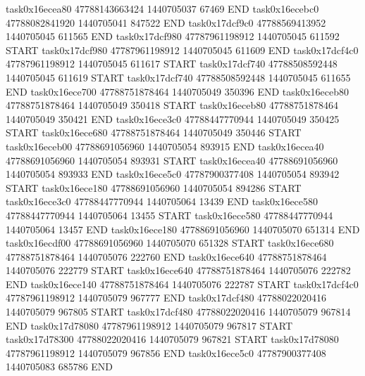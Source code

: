 task0x16ecea80 47788143663424          1440705037                67469  END
task0x16ecebc0 47788082841920          1440705041               847522  END
task0x17dcf9c0 47788569413952          1440705045               611565  END
task0x17dcf980 47787961198912          1440705045               611592  START
task0x17dcf980 47787961198912          1440705045               611609  END
task0x17dcf4c0 47787961198912          1440705045               611617  START
task0x17dcf740 47788508592448          1440705045               611619  START
task0x17dcf740 47788508592448          1440705045               611655  END
task0x16ece700 47788751878464          1440705049               350396  END
task0x16eceb80 47788751878464          1440705049               350418  START
task0x16eceb80 47788751878464          1440705049               350421  END
task0x16ece3c0 47788447770944          1440705049               350425  START
task0x16ece680 47788751878464          1440705049               350446  START
task0x16eceb00 47788691056960          1440705054               893915  END
task0x16ecea40 47788691056960          1440705054               893931  START
task0x16ecea40 47788691056960          1440705054               893933  END
task0x16ece5c0 47787900377408          1440705054               893942  START
task0x16ece180 47788691056960          1440705054               894286  START
task0x16ece3c0 47788447770944          1440705064                13439  END
task0x16ece580 47788447770944          1440705064                13455  START
task0x16ece580 47788447770944          1440705064                13457  END
task0x16ece180 47788691056960          1440705070               651314  END
task0x16ecdf00 47788691056960          1440705070               651328  START
task0x16ece680 47788751878464          1440705076               222760  END
task0x16ece640 47788751878464          1440705076               222779  START
task0x16ece640 47788751878464          1440705076               222782  END
task0x16ece140 47788751878464          1440705076               222787  START
task0x17dcf4c0 47787961198912          1440705079               967777  END
task0x17dcf480 47788022020416          1440705079               967805  START
task0x17dcf480 47788022020416          1440705079               967814  END
task0x17d78080 47787961198912          1440705079               967817  START
task0x17d78300 47788022020416          1440705079               967821  START
task0x17d78080 47787961198912          1440705079               967856  END
task0x16ece5c0 47787900377408          1440705083               685786  END
